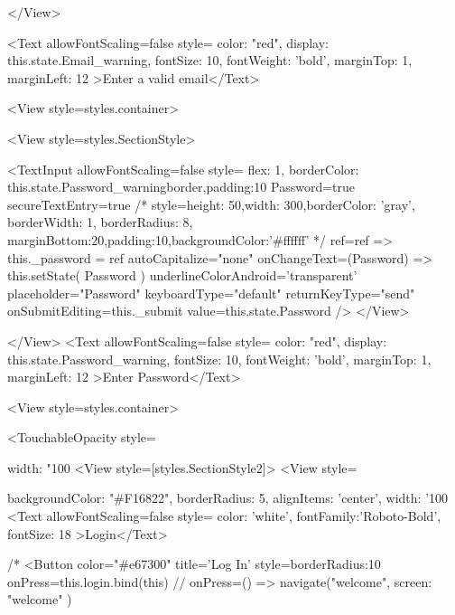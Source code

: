 {{{{{{{{              </View>

              <Text allowFontScaling={false} style={{ color: "red", display: this.state.Email_warning, fontSize: 10, fontWeight: 'bold', marginTop: 1, marginLeft: 12 }}>Enter a valid email</Text>


              <View style={styles.container}>

                <View style={styles.SectionStyle}>

                  <TextInput allowFontScaling={false}
                    style={{ flex: 1, borderColor: this.state.Password_warningborder,padding:10 }}
                    Password={true}
                    secureTextEntry={true}
                    /*  style={{height: 50,width: 300,borderColor: 'gray', borderWidth: 1,
                      borderRadius: 8,
                      marginBottom:20,padding:10,backgroundColor:'#ffffff'}} */
                    ref={ref => {this._password = ref}}
                    autoCapitalize="none"
                    onChangeText={(Password) => this.setState({ Password })}
                    underlineColorAndroid='transparent'
                    placeholder="Password"
                    keyboardType="default"
                    returnKeyType="send"
                    onSubmitEditing={this._submit}
                    value={this.state.Password}
                  />
                </View>

              </View>
              <Text allowFontScaling={false} style={{ color: "red", display: this.state.Password_warning, fontSize: 10, fontWeight: 'bold', marginTop: 1, marginLeft: 12 }}>Enter Password</Text>






              <View style={styles.container}>

                <TouchableOpacity style={{ width: "100%
                  <View style={[styles.SectionStyle2]}>
                    <View style={{ backgroundColor: "#F16822", borderRadius: 5, alignItems: 'center', width: '100%
                      <Text allowFontScaling={false} style={{ color: 'white', fontFamily:'Roboto-Bold', fontSize: 18 }}>Login</Text>
                      {/* <Button
                  color="#e67300"
                  title='Log In'
                  style={{borderRadius:10 }}
                  onPress={this.login.bind(this)}
                 // onPress={() => navigate("welcome", { screen: "welcome" })}

}}}}}}}}}}}}}
